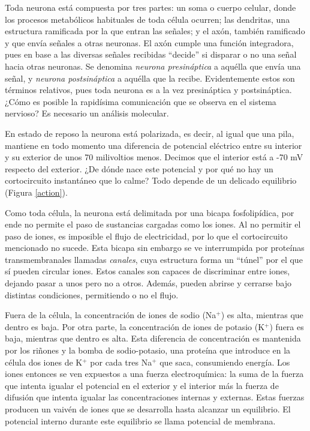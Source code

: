 Toda neurona está compuesta por tres partes: un soma o cuerpo celular, donde los procesos metabólicos habituales de toda célula ocurren; las dendritas, una estructura ramificada por la que entran las señales; y el axón, también ramificado y que envía señales a otras neuronas. El axón cumple una función integradora, pues en base a las diversas señales recibidas \enquote{decide} si disparar o no una señal hacia otras neuronas. Se denomina \textit{neurona presináptica} a aquélla que envía una señal, y \textit{neurona postsináptica} a aquélla que la recibe. Evidentemente estos son términos relativos, pues toda neurona es a la vez presináptica y postsináptica. ¿Cómo es posible la rapidísima comunicación que se observa en el sistema nervioso? Es necesario un análisis molecular.

En estado de reposo la neurona está polarizada, es decir, al igual que una pila, mantiene en todo momento una diferencia de potencial eléctrico entre su interior y su exterior de unos 70 milivoltios menos. Decimos que el interior está a -70 mV respecto del exterior. ¿De dónde nace este potencial y por qué no hay un cortocircuito instantáneo que lo calme? Todo depende de un delicado equilibrio (Figura \ref{action}).

Como toda célula, la neurona está delimitada por una bicapa fosfolipídica, por ende no permite el paso de sustancias cargadas como los iones. Al no permitir el paso de iones, es imposible el flujo de electricidad, por lo que el cortocircuito mencionado no sucede. Esta bicapa sin embargo se ve interrumpida por proteínas transmembranales llamadas \textit{canales}, cuya estructura forma un \enquote{túnel} por el que sí pueden circular iones. Estos canales son capaces de discriminar entre iones, dejando pasar a unos pero no a otros. Además, pueden abrirse y cerrarse bajo distintas condiciones, permitiendo o no el flujo.

Fuera de la célula, la concentración de iones de sodio (Na$^+$) es alta, mientras que dentro es baja. Por otra parte, la concentración de iones de potasio (K$^+$) fuera es baja, mientras que dentro es alta. Esta diferencia de concentración es mantenida por los riñones y la bomba de sodio-potasio, una proteína que introduce en la célula dos iones de K$^+$ por cada tres Na$^+$ que saca, consumiendo energía. Los iones entonces se ven expuestos a una fuerza electroquímica: la suma de la fuerza que intenta igualar el potencial en el exterior y el interior más la fuerza de difusión que intenta igualar las concentraciones internas y externas. Estas fuerzas producen un vaivén de iones que se desarrolla hasta alcanzar un equilibrio. El potencial interno durante este equilibrio se llama potencial de membrana.

